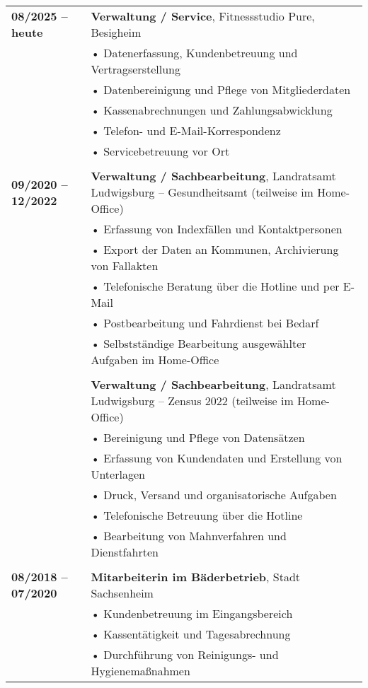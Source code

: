 \documentclass[12pt,a4paper]{article}
\begin{document}
\begin{tabular}{@{}p{4cm}p{11.5cm}@{}}
\textbf{08/2025 – heute} & \textbf{Verwaltung / Service}, Fitnessstudio Pure, Besigheim \\
                         & • Datenerfassung, Kundenbetreuung und Vertragserstellung \\
                         & • Datenbereinigung und Pflege von Mitgliederdaten \\
                         & • Kassenabrechnungen und Zahlungsabwicklung \\
                         & • Telefon- und E-Mail-Korrespondenz \\
                         & • Servicebetreuung vor Ort \\
\\
\textbf{09/2020 – 12/2022} & \textbf{Verwaltung / Sachbearbeitung}, Landratsamt Ludwigsburg – Gesundheitsamt (teilweise im Home-Office) \\
                         & • Erfassung von Indexfällen und Kontaktpersonen \\
                         & • Export der Daten an Kommunen, Archivierung von Fallakten \\
                         & • Telefonische Beratung über die Hotline und per E-Mail \\
                         & • Postbearbeitung und Fahrdienst bei Bedarf \\
                         & • Selbstständige Bearbeitung ausgewählter Aufgaben im Home-Office \\
\\
                         & \textbf{Verwaltung / Sachbearbeitung}, Landratsamt Ludwigsburg – Zensus 2022 (teilweise im Home-Office) \\
                         & • Bereinigung und Pflege von Datensätzen \\
                         & • Erfassung von Kundendaten und Erstellung von Unterlagen \\
                         & • Druck, Versand und organisatorische Aufgaben \\
                         & • Telefonische Betreuung über die Hotline \\
                         & • Bearbeitung von Mahnverfahren und Dienstfahrten \\
\\
\textbf{08/2018 – 07/2020} & \textbf{Mitarbeiterin im Bäderbetrieb}, Stadt Sachsenheim \\
                           & • Kundenbetreuung im Eingangsbereich \\
                           & • Kassentätigkeit und Tagesabrechnung \\
                           & • Durchführung von Reinigungs- und Hygienemaßnahmen \\

\end{tabular}
\end{document}
